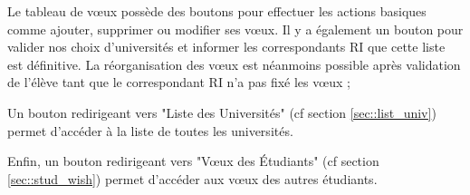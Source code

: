 Le tableau de vœux possède des boutons pour effectuer les actions basiques comme ajouter, supprimer ou modifier ses vœux. Il y a également un bouton pour valider nos choix d'universités et informer les correspondants RI que cette liste est définitive. La réorganisation des vœux est néanmoins possible après validation de l'élève tant que le correspondant RI n'a pas fixé les vœux ;

\bigbreak

Un bouton redirigeant vers "Liste des Universités" (cf section \ref{sec::list_univ}) permet d'accéder à la liste de toutes les universités.

\bigbreak

Enfin, un bouton redirigeant vers "Vœux des Étudiants" (cf section \ref{sec::stud_wish}) permet d'accéder aux vœux des autres étudiants.

